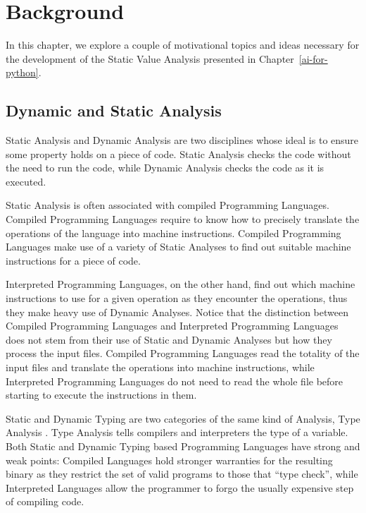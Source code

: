 \chapter{Background}\label{background}

In this chapter, we explore a couple of motivational topics and ideas necessary for the
development of the Static Value Analysis presented in Chapter~\ref{ai-for-python}.

\section{Dynamic and Static Analysis}

Static Analysis and Dynamic Analysis are two disciplines whose ideal is to ensure some
property holds on a piece of code. Static Analysis checks the code without the need to run
the code, while Dynamic Analysis checks the code as it is executed.

Static Analysis is often associated with compiled Programming Languages. Compiled
Programming Languages require to know how to precisely translate the operations of the
language into machine instructions. Compiled Programming Languages make use of a variety
of Static Analyses to find out suitable machine instructions for a piece of code.

Interpreted Programming Languages, on the other hand, find out which machine instructions
to use for a given operation as they encounter the operations, thus they make heavy use of
Dynamic Analyses. Notice that the distinction between Compiled Programming Languages and
Interpreted Programming Languages does not stem from their use of Static and Dynamic
Analyses but how they process the input files. Compiled Programming Languages read the
totality of the input files and translate the operations into machine instructions, while
Interpreted Programming Languages do not need to read the whole file before starting to
execute the instructions in them.

Static and Dynamic Typing are two categories of the same kind of Analysis, Type Analysis
\autocite{pierce_types_2002}. Type Analysis tells compilers and interpreters the type of a
variable. Both Static and Dynamic Typing based Programming Languages have strong and weak
points: Compiled Languages hold stronger warranties for the resulting binary as they
restrict the set of valid programs to those that \enquote{type check}, while Interpreted
Languages allow the programmer to forgo the usually expensive step of compiling code.

